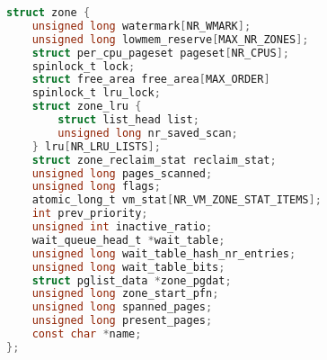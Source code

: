 \begin{lstlisting}[language=c]
struct zone {
    unsigned long watermark[NR_WMARK];
    unsigned long lowmem_reserve[MAX_NR_ZONES];
    struct per_cpu_pageset pageset[NR_CPUS];
    spinlock_t lock;
    struct free_area free_area[MAX_ORDER]
    spinlock_t lru_lock;
    struct zone_lru {
        struct list_head list;
        unsigned long nr_saved_scan;
    } lru[NR_LRU_LISTS];
    struct zone_reclaim_stat reclaim_stat;
    unsigned long pages_scanned;
    unsigned long flags;
    atomic_long_t vm_stat[NR_VM_ZONE_STAT_ITEMS];
    int prev_priority;
    unsigned int inactive_ratio;
    wait_queue_head_t *wait_table;
    unsigned long wait_table_hash_nr_entries;
    unsigned long wait_table_bits;
    struct pglist_data *zone_pgdat;
    unsigned long zone_start_pfn;
    unsigned long spanned_pages;
    unsigned long present_pages;
    const char *name;
};
\end{lstlisting}
